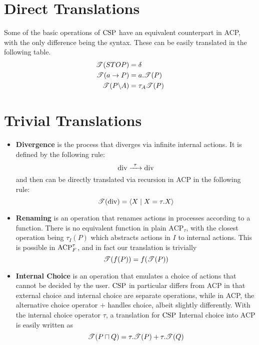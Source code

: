 \documentclass[../hons_project.tex]{subfiles}
\begin{document}
\section{Direct Translations}\label{sc:direct-translations}
Some of the basic operations of $\mathrm{CSP}$ have an equivalent counterpart in ACP, with the only difference being the syntax. These can be easily translated in the following table.
\begin{align*}
	\mathscr{T}(STOP)           & = \delta              \\
	\mathscr{T}(a \to P)        & = a.\mathscr{T}(P)         \\
	\mathscr{T}(P \backslash A) & = \tau_{A}{\mathscr{T}(P)} \\
\end{align*}

\section{Trivial Translations}\label{sc:trivial-translations}
\begin{itemize}
	\item \textbf{Divergence} is the process that diverges via infinite internal actions. It is defined by the following rule:
	      \[\mathrm{div} \prightarrow{\tau} \mathrm{div}\]
	      and then can be directly translated via recursion in ACP in the following rule:
	      \[\mathscr{T}(\mathrm{div}) = \langle X \mid X = \tau.X \rangle\]
	\item \textbf{Renaming} is an operation that renames actions in processes according to a function. There is no equivalent function in plain $\mathrm{ACP}_{\tau}$, with the closest operation being $\tau_{I}(P)$ which abstracts actions in $I$ to internal actions. This is possible in $\mathrm{ACP}_{F}^{\tau}$, and in fact our translation is trivially
	      \[\mathscr{T}(f(P)) = f(\mathscr{T}(P))\]

	\item \textbf{Internal Choice} is an operation that emulates a choice of actions that cannot be decided by the user. $\mathrm{CSP}$ in particular differs from ACP in that external choice and internal choice are separate operations, while in ACP, the alternative choice operator $+$ handles choice, albeit slightly differently. With the internal choice operator $\tau$, a translation for $\mathrm{CSP}$ Internal choice into ACP is easily written as
	      \[\mathscr{T}(P \sqcap Q) = \tau.\mathscr{T}(P) + \tau.\mathscr{T}(Q)\]
\end{itemize}
\end{document}
